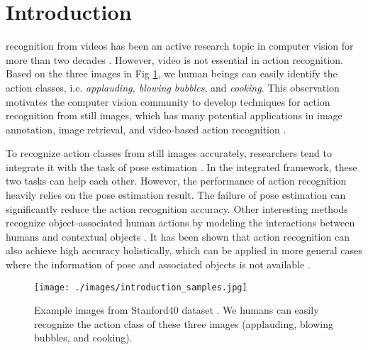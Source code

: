 \documentclass[journal]{IEEEtran}
\begin{document}
\IEEEpeerreviewmaketitle



\section{Introduction}





 recognition from videos has been an active research topic in computer vision for more than two decades \cite{computers2020088,TCSCVT_1,TCSVT_2,TCSVT_3,TCSVT_4,reviewer1_6918650,reviewer1_Baccouche:2011:SDL:2177908.2177914,reviewer1_Dobhal2015178}. However, video is not essential in action recognition. Based on the three images in Fig \ref{fig:introductionExample}, we human beings can easily identify the action classes, i.e. \textit{applauding, blowing bubbles}, and \textit{cooking}. This observation motivates the computer vision community to develop techniques for action recognition from still images, which has many potential applications in image annotation, image retrieval, and video-based action recognition \cite{StillImageSurvey}.


To recognize action classes from still images accurately, researchers tend to integrate it with the task of pose estimation \cite{YangWMCVPR10,Yao_modeling_mutual_2010_CVPR}.
In the integrated framework, these two tasks can help each other.
However, the performance of action recognition heavily relies on the pose estimation result. The failure of pose estimation can significantly reduce the action recognition accuracy. Other interesting methods recognize object-associated human actions by modeling the interactions between humans and contextual objects \cite{Delaitre11learningperson-object,GroupletYaoBangpengFeifeiLI}.
It has been shown that action recognition can also achieve high accuracy holistically, which can be applied in more general cases where the information of pose and associated objects is not available \cite{sharma:CVPR2012_Discriminative,Delaitre10recognizinghuman,sharma:CVPR2013}.

\begin{figure}[h]
	\begin{center}
		\texttt{[image: ./images/introduction\_samples.jpg]}
	\end{center}
	\caption{Example images from Stanford40 dataset \cite{Yao11humanaction__Stanford40}. We humans can easily recognize the action class of these three images (applauding, blowing bubbles, and cooking).}
	\label{fig:introductionExample}
\end{figure}
\end{document}
